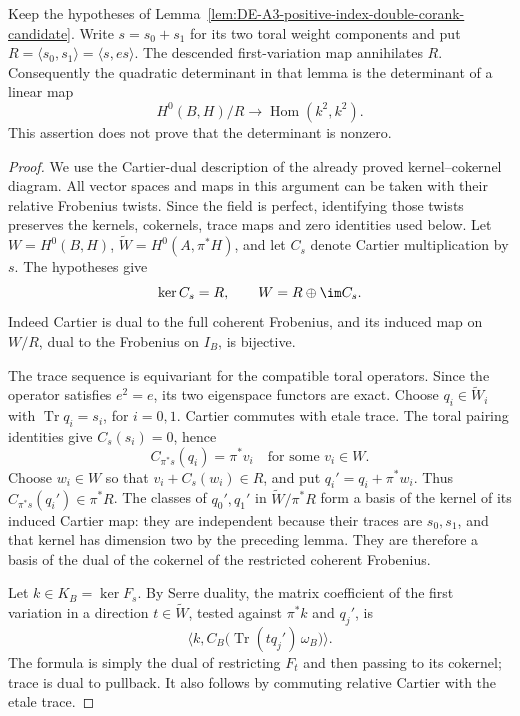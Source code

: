 \begin{lemma}
\label{lem:DE-A3-positive-trace-radical}
Keep the hypotheses of
Lemma~\ref{lem:DE-A3-positive-index-double-corank-candidate}.
Write $s=s_0+s_1$ for its two toral weight components and put
$R=\langle s_0,s_1\rangle=\langle s,es\rangle$.
The descended first-variation map annihilates $R$. Consequently
the quadratic determinant in that lemma is the determinant of
a linear map
\[
       H^0(B,H)/R\longrightarrow\operatorname{Hom}(k^2,k^2).
\]
This assertion does not prove that the determinant is nonzero.
\end{lemma}
\begin{proof}
We use the Cartier-dual description of the already proved
kernel--cokernel diagram. All vector spaces and maps in this
argument can be taken with their relative Frobenius twists.
Since the field is perfect, identifying those twists preserves
the kernels, cokernels, trace maps and zero identities used below.
Let $W=H^0(B,H)$, $\widetilde W=H^0(A,\pi^*H)$, and let
$C_s$ denote Cartier multiplication by $s$. The hypotheses give
\[
 \ker C_s=R,\qquad W=R\oplus\im C_s.
\]
Indeed Cartier is dual to the full coherent Frobenius, and its
induced map on $W/R$, dual to the Frobenius on $I_B$, is bijective.

The trace sequence is equivariant for the compatible toral
operators. Since the operator satisfies $e^2=e$, its two
eigenspace functors are exact. Choose $q_i\in\widetilde W_i$
with $\operatorname{Tr}q_i=s_i$, for $i=0,1$.
Cartier commutes with etale trace. The toral pairing identities
give $C_s(s_i)=0$, hence
\[
             C_{\pi^*s}(q_i)=\pi^*v_i
                 \quad\text{for some }v_i\in W.
\]
Choose $w_i\in W$ so that
$v_i+C_s(w_i)\in R$, and put $q_i'=q_i+\pi^*w_i$.
Thus $C_{\pi^*s}(q_i')\in\pi^*R$.
The classes of $q_0',q_1'$ in
$\widetilde W/\pi^*R$ form a basis of the kernel of its induced
Cartier map: they are independent because their traces are
$s_0,s_1$, and that kernel has dimension two by the preceding
lemma. They are therefore a basis of the dual of the cokernel
of the restricted coherent Frobenius.

Let $k\in K_B=\ker F_s$. By Serre duality, the matrix coefficient
of the first variation in a direction $t\in\widetilde W$,
tested against $\pi^*k$ and $q_j'$, is
\[
       \bigl\langle k,
          C_B\bigl(\operatorname{Tr}(tq_j')\,\omega_B\bigr)
       \bigr\rangle.
                                                        \tag{DE-TR1}
\]
The formula is simply the dual of restricting $F_t$ and then
passing to its cokernel; trace is dual to pullback. It also
follows by commuting relative Cartier with the etale trace.


\end{proof}
